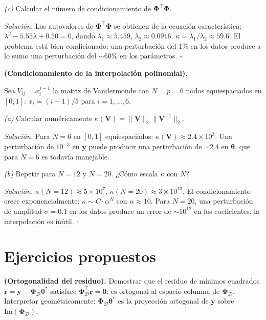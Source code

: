 \begin{ejercicio}
\medskip\noindent\textit{(c)} Calcular el número de condicionamiento
de $\bm{\Phi}^\top\bm{\Phi}$.

\medskip\noindent\textit{Solución.}
Los autovalores de $\bm{\Phi}^\top\bm{\Phi}$ se obtienen de la
ecuación característica: $\lambda^2 - 5.55\lambda + 0.50 = 0$, dando
$\lambda_1 \approx 5.459$, $\lambda_2 \approx 0.0916$.
$\kappa = \lambda_1/\lambda_2 \approx 59.6$. El problema está bien
condicionado: una perturbación del 1\% en los datos produce a lo sumo
una perturbación del $\sim 60$\% en los parámetros. $\square$
\end{ejercicio}

\begin{ejercicio}
\label{ej:vandermonde_cond}
\textbf{(Condicionamiento de la interpolación polinomial).}

Sea $V_{ij} = x_i^{j-1}$ la matriz de Vandermonde con
$N = p = 6$ nodos equiespaciados en $[0, 1]$:
$x_i = (i-1)/5$ para $i = 1, \ldots, 6$.

\medskip\noindent\textit{(a)} Calcular numéricamente
$\kappa(\bm{V}) = \|\bm{V}\|_2\|\bm{V}^{-1}\|_2$.

\medskip\noindent\textit{Solución.}
Para $N = 6$ en $[0,1]$ equiespaciados: $\kappa(\bm{V}) \approx 2.4
\times 10^3$. Una perturbación de $10^{-3}$ en $\bm{y}$ puede producir
una perturbación de $\sim 2.4$ en $\bm{\theta}$, que para $N = 6$ es
todavía manejable.

\medskip\noindent\textit{(b)} Repetir para $N = 12$ y $N = 20$.
¿Cómo escala $\kappa$ con $N$?

\medskip\noindent\textit{Solución.}
$\kappa(N=12) \approx 5 \times 10^7$,
$\kappa(N=20) \approx 3 \times 10^{13}$.
El condicionamiento crece exponencialmente: $\kappa \sim C \cdot
\alpha^N$ con $\alpha \approx 10$. Para $N = 20$, una perturbación
de amplitud $\sigma = 0.1$ en los datos produce un error de
$\sim 10^{12}$ en los coeficientes: la interpolación es inútil.
$\square$
\end{ejercicio}

\section*{Ejercicios propuestos}

\begin{ejercicio}
\label{ej:ortogonalidad}
\textbf{(Ortogonalidad del residuo).}
Demostrar que el residuo de mínimos cuadrados
$\bm{r} = \bm{y} - \bm{\Phi}_{\mathcal{D}}\bm{\theta}^*$ satisface
$\bm{\Phi}_{\mathcal{D}}^\top \bm{r} = \bm{0}$: es ortogonal al
espacio columna de $\bm{\Phi}_{\mathcal{D}}$. Interpretar
geométricamente: $\bm{\Phi}_{\mathcal{D}}\bm{\theta}^*$ es la
proyección ortogonal de $\bm{y}$ sobre
$\text{Im}(\bm{\Phi}_{\mathcal{D}})$.
\end{ejercicio}

